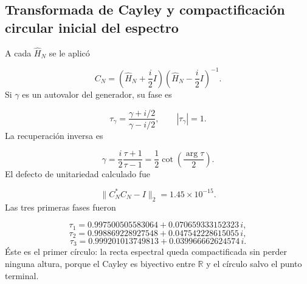 \subsection{Transformada de Cayley y compactificación circular inicial del espectro}
A cada \(\widehat H_N\) se le aplicó\par
\[
C_N=
\left(\widehat H_N+\frac{i}{2}I\right)
\left(\widehat H_N-\frac{i}{2}I\right)^{-1}.
\]
Si \(\gamma\) es un autovalor del generador, su fase es\par
\[
\tau_\gamma
=
\frac{\gamma+i/2}{\gamma-i/2},
\qquad |\tau_\gamma|=1.
\]
La recuperación inversa es\par
\[
\gamma
=
\frac{i}{2}\frac{\tau+1}{\tau-1}
=
\frac12\cot\!\left(\frac{\arg\tau}{2}\right).
\]
El defecto de unitariedad calculado fue\par
\[
\|C_N^*C_N-I\|_2=1.45\times10^{-15}.
\]
Las tres primeras fases fueron\par
\[
\tau_1=
0.997500505583064
+0.070659333152323\,i,
\]
\[
\tau_2=
0.998869228927548
+0.047542228615055\,i,
\]
\[
\tau_3=
0.999201013749813
+0.039966662624574\,i.
\]
Éste es el primer círculo: la recta espectral queda compactificada sin perder ninguna altura, porque el Cayley es biyectivo entre \(\mathbb R\) y el círculo salvo el punto terminal.\par
{}
